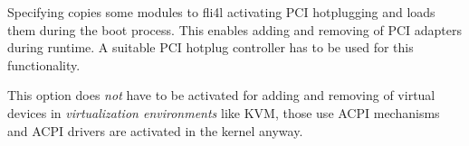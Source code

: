   Specifying  copies some modules to fli4l activating
  PCI hotplugging and loads them during the boot process. This enables adding
  and removing of PCI adapters during runtime. A suitable PCI hotplug controller
  has to be used for this functionality.

  This option does \emph{not} have to be activated for adding and removing
  of virtual devices in \emph{virtualization environments} like KVM, those
  use ACPI mechanisms and ACPI drivers are activated in the kernel anyway.
